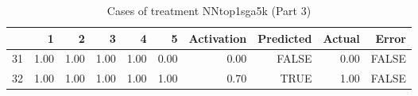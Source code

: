 \begin{table}[ht]
\centering
\begin{tabular}{rrrrrrrrrr}
  \hline
 & 1 & 2 & 3 & 4 & 5 & Activation & Predicted & Actual & Error \\ 
  \hline
31 & 1.00 & 1.00 & 1.00 & 1.00 & 0.00 & 0.00 & FALSE & 0.00 & FALSE \\ 
  32 & 1.00 & 1.00 & 1.00 & 1.00 & 1.00 & 0.70 & TRUE & 1.00 & FALSE \\ 
   \hline
\end{tabular}
\caption{Cases of treatment NNtop1sga5k (Part 3)} 
\end{table}
